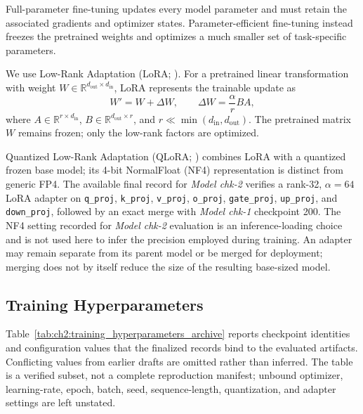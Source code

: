Full-parameter fine-tuning updates every model parameter and must retain the
associated gradients and optimizer states. Parameter-efficient fine-tuning
instead freezes the pretrained weights and optimizes a much smaller set of
task-specific parameters.

We use Low-Rank Adaptation (LoRA; \cite{hu2021lora}). For a pretrained linear
transformation with weight
$W\in\mathbb{R}^{d_{\mathrm{out}}\times d_{\mathrm{in}}}$, LoRA represents
the trainable update as
\begin{equation}
    W'=W+\Delta W,
    \qquad
    \Delta W=\frac{\alpha}{r}BA,
\end{equation}
where $A\in\mathbb{R}^{r\times d_{\mathrm{in}}}$,
$B\in\mathbb{R}^{d_{\mathrm{out}}\times r}$, and
$r\ll\min(d_{\mathrm{in}},d_{\mathrm{out}})$. The pretrained matrix $W$
remains frozen; only the low-rank factors are optimized.

Quantized Low-Rank Adaptation (QLoRA; \cite{dettmers2024qlora}) combines LoRA
with a quantized frozen base model; its 4-bit NormalFloat (NF4) representation
is distinct from generic FP4. The available final record for \textit{Model chk-2}
verifies a rank-32, $\alpha=64$ LoRA adapter on \texttt{q\_proj},
\texttt{k\_proj}, \texttt{v\_proj}, \texttt{o\_proj},
\texttt{gate\_proj}, \texttt{up\_proj}, and \texttt{down\_proj}, followed by
an exact merge with \textit{Model chk-1} checkpoint 200. The NF4 setting recorded
for \textit{Model chk-2} evaluation is an inference-loading choice and is not used
here to infer the precision employed during training. An adapter may remain
separate from its parent model or be merged for deployment; merging does not
by itself reduce the size of the resulting base-sized model.

\subsection{Training Hyperparameters}\label{ch2:sec:parameter}

Table~\ref{tab:ch2:training_hyperparameters_archive} reports checkpoint
identities and configuration values that the finalized records bind to the
evaluated artifacts. Conflicting values from earlier drafts are omitted rather
than inferred. The table is a verified subset, not a complete reproduction
manifest; unbound optimizer, learning-rate, epoch, batch, seed, sequence-length,
quantization, and adapter settings are left unstated.

